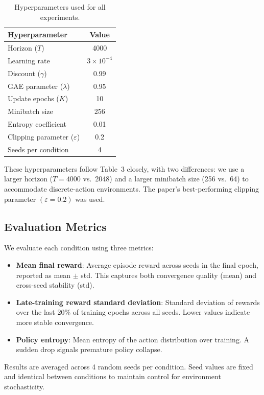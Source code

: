 \documentclass{article}
\begin{document}
\begin{table}[h]
\caption{Hyperparameters used for all experiments.}
\label{tab:hyperparams}
\begin{center}
\begin{tabular}{lc}
\toprule
\textbf{Hyperparameter} & \textbf{Value} \\
\midrule
Horizon ($T$)                        & 4000               \\
Learning rate                        & $3 \times 10^{-4}$ \\
Discount ($\gamma$)                  & 0.99               \\
GAE parameter ($\lambda$)            & 0.95               \\
Update epochs ($K$)                  & 10                 \\
Minibatch size                       & 256                \\
Entropy coefficient                  & 0.01               \\
Clipping parameter ($\varepsilon$)   & 0.2                \\
Seeds per condition                  & 4                  \\
\bottomrule
\end{tabular}
\end{center}
\end{table}

These hyperparameters follow \citep{schulman2017ppo} Table~3 closely, with two differences: we use a larger horizon ($T=4000$ vs.\ 2048) and a larger minibatch size (256 vs.\ 64) to accommodate discrete-action environments. The paper's best-performing clipping parameter $(\varepsilon=0.2)$ was used.

\subsection{Evaluation Metrics}

We evaluate each condition using three metrics:
\begin{itemize}
    \item \textbf{Mean final reward}: Average episode reward across seeds in the final epoch, reported as mean $\pm$ std. This captures both convergence quality (mean) and cross-seed stability (std).
    \item \textbf{Late-training reward standard deviation}: Standard deviation of rewards over the last 20\% of training epochs across all seeds. Lower values indicate more stable convergence.
    \item \textbf{Policy entropy}: Mean entropy of the action distribution over training. A sudden drop signals premature policy collapse.
\end{itemize}
Results are averaged across 4 random seeds per condition. Seed values are fixed and identical between conditions to maintain control for environment stochasticity.
\end{document}
